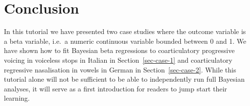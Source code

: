 \documentclass[
  authoryear,
  preprint,
  3p]{elsarticle}
\providecommand{\DIFaddbegin}{} %
\providecommand{\DIFaddend}{} %
\providecommand{\DIFdelbegin}{} %
\providecommand{\DIFdelend}{} %
\newcommand{\DIFscaledelfig}{0.5}
\newlength{\DIFdelgraphicswidth} %
\newlength{\DIFdelgraphicsheight} %
\newcommand{\DIFaddincludegraphics}[2][]{{\color{blue}\fbox{\DIFOincludegraphics[#1]{#2}}}} %
\newcommand{\DIFdelincludegraphics}[2][]{%
\sbox{\DIFdelgraphicsbox}{\DIFOincludegraphics[#1]{#2}}%
\settoboxwidth{\DIFdelgraphicswidth}{\DIFdelgraphicsbox} %
\settoboxtotalheight{\DIFdelgraphicsheight}{\DIFdelgraphicsbox} %
\scalebox{\DIFscaledelfig}{%
\parbox[b]{\DIFdelgraphicswidth}{\usebox{\DIFdelgraphicsbox}\\[-\baselineskip] \rule{\DIFdelgraphicswidth}{0em}}\llap{\resizebox{\DIFdelgraphicswidth}{\DIFdelgraphicsheight}{%
\setlength{\unitlength}{\DIFdelgraphicswidth}%
\begin{picture}(1,1)%
\thicklines\linethickness{2pt} %
{\color[rgb]{1,0,0}\put(0,0){\framebox(1,1){}}}%
{\color[rgb]{1,0,0}\put(0,0){\line( 1,1){1}}}%
{\color[rgb]{1,0,0}\put(0,1){\line(1,-1){1}}}%
\end{picture}%
}\hspace*{3pt}}} %
} %
\DeclareRobustCommand{\DIFaddbegin}{\DIFOaddbegin \let\includegraphics\DIFaddincludegraphics} %
\DeclareRobustCommand{\DIFaddend}{\DIFOaddend \let\includegraphics\DIFOincludegraphics} %
\DeclareRobustCommand{\DIFdelbegin}{\DIFOdelbegin \let\includegraphics\DIFdelincludegraphics} %
\DeclareRobustCommand{\DIFdelend}{\DIFOaddend \let\includegraphics\DIFOincludegraphics} %
\begin{document}
\section{Conclusion}\label{conclusion}

In this tutorial we have presented two case studies where the outcome
variable is a beta variable, i.e.~a numeric continuous variable bounded
between 0 and 1. We have shown how to fit Bayesian beta regressions to
coarticulatory progressive voicing in voiceless stops in Italian in
Section~\ref{sec-case-1} and coarticulatory regressive nasalisation in
vowels in German in Section~\ref{sec-case-2}. While this tutorial alone
will not be sufficient to be able to independently run full Bayesian
analyses, it will serve as a first introduction for readers to jump
start their learning.


\DIFdelbegin %
\DIFdelend \DIFaddbegin 
\DIFaddend 
\end{document}
